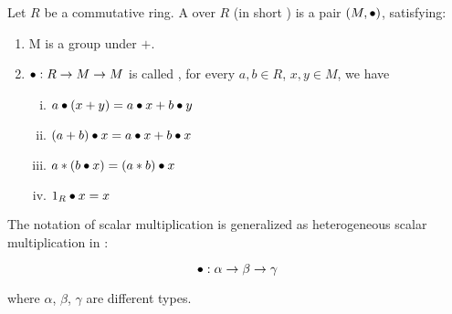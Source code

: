     
        



\begin{definition}[Module]
    \label{Module}
    \leanok

    Let $R$ be a commutative ring. A  over $R$ (in short ) is a pair $(M, \bullet)$, satisfying:

    \begin{enumerate}
      \item M is a group under $+$.
    
      \item $\bullet : R \to M \to M$ is called , for every $a, b \in R$, $x, y \in M$, we have
      
        \begin{enumerate}[(i)]
            \item $a \bullet (x + y) = a \bullet x + b \bullet y$
            \item $(a + b) \bullet x = a \bullet x + b \bullet x$
            \item $a * (b \bullet x)=(a * b) \bullet x$
            \item $1_R \bullet x = x$
        \end{enumerate}
    \end{enumerate}

\end{definition}

\begin{remark}
    \label{mk:Module}

    The notation of scalar multiplication is generalized as heterogeneous scalar multiplication  in \Mathlib:

    $$
    \bullet : \alpha \to \beta \to \gamma
    $$

    where $\alpha$, $\beta$, $\gamma$ are different types.
    
\end{remark}


